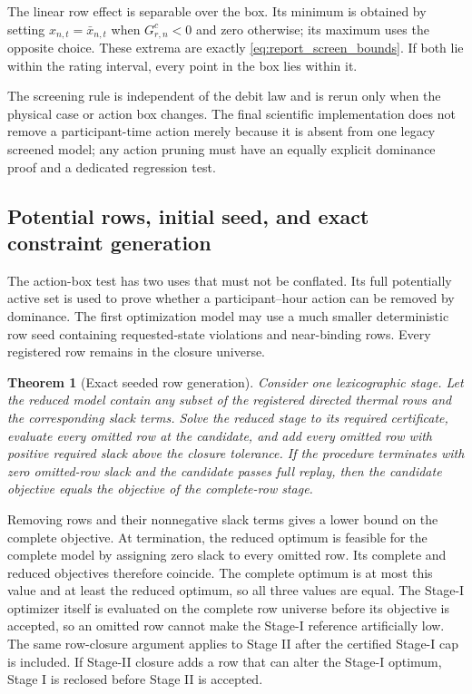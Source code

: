\documentclass[10pt,journal,onecolumn]{IEEEtran}
\newtheorem{theorem}{Theorem}[section]
\begin{document}
\begin{IEEEproof}
The linear row effect is separable over the box. Its minimum is obtained by
setting $x_{n,t}=\bar x_{n,t}$ when $G_{r,n}^c<0$ and zero otherwise; its
maximum uses the opposite choice. These extrema are exactly
\eqref{eq:report_screen_bounds}. If both lie within the rating interval, every
point in the box lies within it.
\end{IEEEproof}

The screening rule is independent of the debit law and is rerun only when the
physical case or action box changes. The final scientific implementation does
not remove a participant-time action merely because it is absent from one
legacy screened model; any action pruning must have an equally explicit
dominance proof and a dedicated regression test.

\subsection{Potential rows, initial seed, and exact constraint generation}

The action-box test has two uses that must not be conflated. Its full potentially
active set is used to prove whether a participant--hour action can be removed by
dominance. The first optimization model may use a much smaller deterministic
row seed containing requested-state violations and near-binding rows. Every
registered row remains in the closure universe.

\begin{theorem}[Exact seeded row generation]
\label{thm:seeded_closure}
Consider one lexicographic stage. Let the reduced model contain any subset of the
registered directed thermal rows and the corresponding slack terms. Solve the
reduced stage to its required certificate, evaluate every omitted row at the
candidate, and add every omitted row with positive required slack above the
closure tolerance. If the procedure terminates with zero omitted-row slack and
the candidate passes full replay, then the candidate objective equals the
objective of the complete-row stage.
\end{theorem}

\begin{IEEEproof}
Removing rows and their nonnegative slack terms gives a lower bound on the
complete objective. At termination, the reduced optimum is feasible for the
complete model by assigning zero slack to every omitted row. Its complete and
reduced objectives therefore coincide. The complete optimum is at most this
value and at least the reduced optimum, so all three values are equal. The Stage-I optimizer itself is evaluated on the complete row universe before
its objective is accepted, so an omitted row cannot make the Stage-I reference
artificially low. The same row-closure argument applies to Stage II after the
certified Stage-I cap is included. If Stage-II closure adds a row that can alter
the Stage-I optimum, Stage I is reclosed before Stage II is accepted.
\end{IEEEproof}
\end{document}
